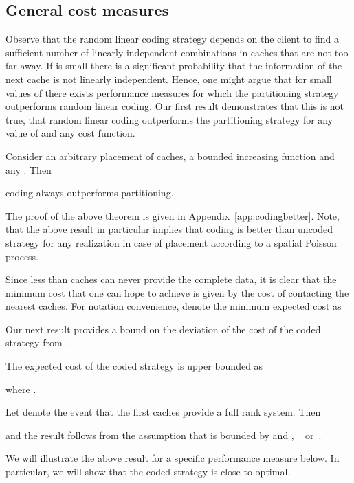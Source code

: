 \subsection{General cost measures}

Observe that the random linear coding strategy depends on the client to find a sufficient number of linearly independent combinations in caches that are not too far away. If  is small there is a significant probability that the information of the next cache is not linearly independent. Hence, one might argue that for small values of  there exists performance measures for which the partitioning strategy outperforms random linear coding. Our first result demonstrates that this is not true, \ie that random linear coding outperforms the partitioning strategy for any value of  and any cost function.
\begin{theorem}  \label{th:codingbetter}
Consider an arbitrary placement of caches, a bounded increasing function  and any . Then

\ie coding always outperforms partitioning.
\end{theorem}
The proof of the above theorem is given in Appendix~\ref{app:codingbetter}.
Note, that the above result in particular implies that coding is better than uncoded strategy
for any realization in case of placement according to a spatial Poisson process.



Since less than  caches can never provide the complete data, it is clear that the minimum cost that one can hope to achieve is given by the cost of contacting the nearest  caches. For notation convenience, denote the minimum expected cost as



Our next result provides a bound on the deviation of the cost of the coded strategy from .
\begin{theorem} \label{th:upper}
The expected cost of the coded strategy is upper bounded as

where .
\end{theorem}
\begin{IEEEproof} Let  denote the event that the first  caches provide a full rank system. Then

and the result follows from the assumption that  is bounded by  and , \cf~\cite{ho2006random} or~\cite{ncfundamentals}.
\end{IEEEproof}
We will illustrate the above result for a specific performance measure below. In particular, we will show that the coded strategy is close to optimal.

